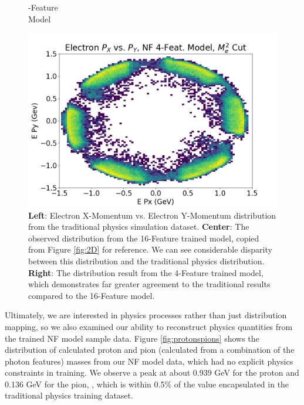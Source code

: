 \begin{figure}[H]
\begin{minipage}{0.31323\textwidth}
            \end{minipage}
                 \begin{minipage}{0.31323\textwidth}
                -Feature\\ Model
               
                \includegraphics[width=.99\textwidth,trim={0 0 0 0},clip]{Chapters/Ch3-Simulations/normalizing_flows/pics/FinalPictures/2D_Hists_4F/Electron_P_X_vs_P_Y,_NF_4-Feat_Model,_M_e2_Cut.png}
            \end{minipage}
            \caption[Placeholder Short text]{\textbf{Left}: Electron X-Momentum vs. Electron Y-Momentum distribution from the traditional physics simulation dataset. \textbf{Center}: The observed distribution from the 16-Feature trained model, copied from Figure \ref{fig:2D} for reference. We can see considerable disparity between this distribution and the traditional physics distribution. \textbf{Right}: The distribution result from the 4-Feature trained model, which demonstrates far greater agreement to the traditional results compared to the 16-Feature model. }
            \label{fig:2D4F}
        \end{figure}
        
        
        Ultimately, we are interested in physics processes rather than just distribution mapping, so we also examined our ability to reconstruct physics quantities from the trained NF model sample data. Figure \ref{fig:protonspions} shows the distribution of calculated proton and pion (calculated from a combination of the photon features) masses from our NF model data, which had no explicit physics constraints in training. We observe a peak at about 0.939 GeV for the proton and 0.136 GeV for the pion, , which is within 0.5\% of the value encapsulated in the traditional physics training dataset. 
        

